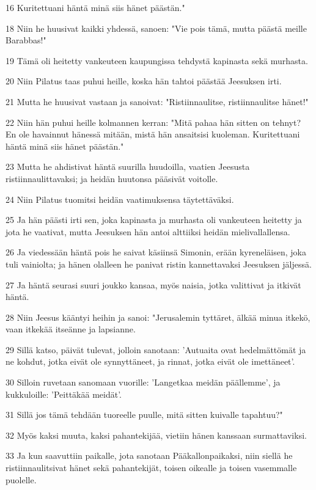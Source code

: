 \par 16 Kuritettuani häntä minä siis hänet päästän."
\par 18 Niin he huusivat kaikki yhdessä, sanoen: "Vie pois tämä, mutta päästä meille Barabbas!"
\par 19 Tämä oli heitetty vankeuteen kaupungissa tehdystä kapinasta sekä murhasta.
\par 20 Niin Pilatus taas puhui heille, koska hän tahtoi päästää Jeesuksen irti.
\par 21 Mutta he huusivat vastaan ja sanoivat: "Ristiinnaulitse, ristiinnaulitse hänet!"
\par 22 Niin hän puhui heille kolmannen kerran: "Mitä pahaa hän sitten on tehnyt? En ole havainnut hänessä mitään, mistä hän ansaitsisi kuoleman. Kuritettuani häntä minä siis hänet päästän."
\par 23 Mutta he ahdistivat häntä suurilla huudoilla, vaatien Jeesusta ristiinnaulittavaksi; ja heidän huutonsa pääsivät voitolle.
\par 24 Niin Pilatus tuomitsi heidän vaatimuksensa täytettäväksi.
\par 25 Ja hän päästi irti sen, joka kapinasta ja murhasta oli vankeuteen heitetty ja jota he vaativat, mutta Jeesuksen hän antoi alttiiksi heidän mielivallallensa.
\par 26 Ja viedessään häntä pois he saivat käsiinsä Simonin, erään kyreneläisen, joka tuli vainiolta; ja hänen olalleen he panivat ristin kannettavaksi Jeesuksen jäljessä.
\par 27 Ja häntä seurasi suuri joukko kansaa, myös naisia, jotka valittivat ja itkivät häntä.
\par 28 Niin Jeesus kääntyi heihin ja sanoi: "Jerusalemin tyttäret, älkää minua itkekö, vaan itkekää itseänne ja lapsianne.
\par 29 Sillä katso, päivät tulevat, jolloin sanotaan: 'Autuaita ovat hedelmättömät ja ne kohdut, jotka eivät ole synnyttäneet, ja rinnat, jotka eivät ole imettäneet'.
\par 30 Silloin ruvetaan sanomaan vuorille: 'Langetkaa meidän päällemme', ja kukkuloille: 'Peittäkää meidät'.
\par 31 Sillä jos tämä tehdään tuoreelle puulle, mitä sitten kuivalle tapahtuu?"
\par 32 Myös kaksi muuta, kaksi pahantekijää, vietiin hänen kanssaan surmattaviksi.
\par 33 Ja kun saavuttiin paikalle, jota sanotaan Pääkallonpaikaksi, niin siellä he ristiinnaulitsivat hänet sekä pahantekijät, toisen oikealle ja toisen vasemmalle puolelle.
